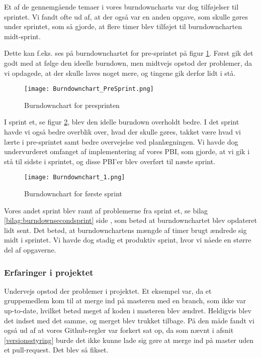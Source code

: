 Et af de gennemgående temaer i vores burndowncharts var dog tilføjelser til sprintet.
Vi fandt ofte ud af, at der også var en anden opgave, som skulle gøres under sprintet, som så gjorde, at flere timer blev tilføjet til burndowncharten midt-sprint. 

Dette kan f.eks. ses på burndownchartet for pre-sprintet på figur \ref{fig:burndownpresprint}.
Først gik det godt med at følge den ideelle burndown, men midtvejs opstod der problemer, da vi opdagede, at der skulle laves noget mere, og tingene gik derfor lidt i stå.

\begin{figure}[h]
    \caption{Burndownchart for presprinten}
    \centering
        \texttt{[image: Burndownchart\_PreSprint.png]}
    \label{fig:burndownpresprint}
\end{figure}

I sprint et, se figur \ref{fig:burndownfirstsprint}, blev den idelle burndown overholdt bedre.
I det sprint havde vi også bedre overblik over, hvad der skulle gøres, takket være hvad vi lærte i pre-sprintet samt bedre overvejelse ved planlægningen.
Vi havde dog undervurderet omfanget af implementering af vores PBI, som gjorde, at vi gik i stå til sidste i sprintet, og disse PBI'er blev overført til næste sprint.

\begin{figure}[h]
    \caption{Burndownchart for første sprint}
    \centering
        \texttt{[image: Burndownchart\_1.png]}
    \label{fig:burndownfirstsprint}
\end{figure}

Vores andet sprint blev ramt af problemerne fra sprint et, se bilag \ref{bilag:burndownsecondsprint} side \pageref{bilag:burndownsecondsprint}, som betød at burndownchartet blev opdateret lidt sent.
Det betød, at burndownchartens mængde af timer brugt ændrede sig midt i sprintet.
Vi havde dog stadig et produktiv sprint, hvor vi nåede en større del af opgaverne.



\subsubsection{Erfaringer i projektet}

Undervejs opstod der problemer i projektet.
Et eksempel var, da et gruppemedlem kom til at merge ind på masteren med en branch, som ikke var up-to-date, hvilket betød meget af koden i masteren blev ændret.
Heldigvis blev det indset med det samme, og merget blev trukket tilbage.
På den måde fandt vi også ud af at vores Github-regler var forkert sat op, da som nævnt i afsnit \ref{versionsstyring} burde det ikke kunne lade sig gøre at merge ind på master uden et pull-request.
Det blev så fikset.

